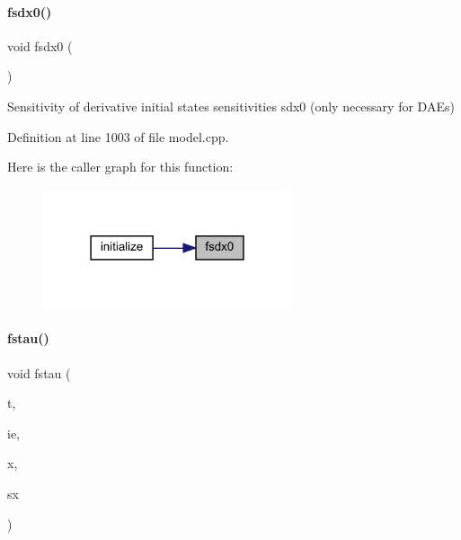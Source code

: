 \paragraph{\texorpdfstring{fsdx0()}{fsdx0()}}
{\footnotesize\ttfamily void fsdx0 (\begin{DoxyParamCaption}{ }\end{DoxyParamCaption})\hspace{0.3cm}{\ttfamily [virtual]}}

Sensitivity of derivative initial states sensitivities sdx0 (only necessary for D\+A\+Es) 

Definition at line 1003 of file model.\+cpp.

Here is the caller graph for this function\+:
\nopagebreak
\begin{figure}[H]
\begin{center}
\leavevmode
\includegraphics[width=207pt]{classamici_1_1_model_a946b60982bd7321bcc2bdae10ea8358f_icgraph}
\end{center}
\end{figure}
\mbox{\label{classamici_1_1_model_a382cd2049c70f0dd4aafe483e4a50cff}} 
\paragraph{\texorpdfstring{fstau()}{fstau()}\hspace{0.1cm}{\footnotesize\ttfamily [1/2]}}
{\footnotesize\ttfamily void fstau (\begin{DoxyParamCaption}\item[{const \mbox{\hyperlink{namespaceamici_a1bdce28051d6a53868f7ccbf5f2c14a3}{realtype}}}]{t,  }\item[{const int}]{ie,  }\item[{const \mbox{\hyperlink{classamici_1_1_ami_vector}{Ami\+Vector}} $\ast$}]{x,  }\item[{const \mbox{\hyperlink{classamici_1_1_ami_vector_array}{Ami\+Vector\+Array}} $\ast$}]{sx }\end{DoxyParamCaption})}

